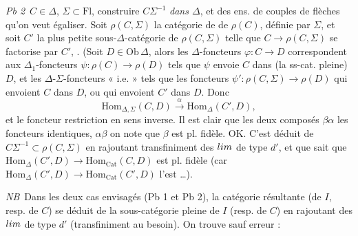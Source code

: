 \documentclass[11pt,a4paper]{article}
\begin{document}
\emph{Pb 2}\ $C \in \Delta$, $\Sigma \subset \mathrm{Fl}$,
construire $C\Sigma^{-1}$ \emph{dans $\Delta$}, et des ens. de
couples de flèches qu'on veut égaliser. 
  Soit $\rho(C, \Sigma)$ la
catégorie de  de $\rho(C)$, définie
par $\Sigma$, et soit $C'$ la plus petite sous-$\Delta$-catégorie
 de $\rho(C, \Sigma)$  telle que $C \to
\rho(C, \Sigma)$ se factorise par $C'$, . (Soit
$D \in \mathrm{Ob}\,\Delta$, alors les $\Delta$-foncteurs $\varphi : C
\to D$ correspondent aux $\Delta_{1}$-foncteurs $\psi : \rho(C) \to
\rho(D)$ tels que $\psi$ envoie $C$ dans (la ss-cat. pleine) $D$, et
les $\Delta$-$\Sigma$-foncteurs « i.e. » tels que les foncteurs $\psi' :
\rho(C, \Sigma) \to \rho(D)$ \struck{\ill{}} qui envoient $C$ dans $D$,
 ou qui envoient  $C'$ dans $D$. Donc
\[
  \mathrm{Hom}_{\Delta, \Sigma}(C, D) \xrightarrow{\ \alpha\ }
  \mathrm{Hom}_{\Delta}(C', D),
\]
 et
\uncertain{$\beta$} le foncteur restriction en sens inverse. Il est clair
que les deux composés \ill{} $\beta\alpha$ \struck{\ill{}} les foncteurs
identiques, \ill{}  $\alpha\beta$ on note que
 $\beta$ est pl. fidèle. OK. C'est
déduit de $C\Sigma^{-1} \subset \rho(C, \Sigma)$ en rajoutant
transfiniment des $\varprojlim$ de type $d'$, et que sait que
$\mathrm{Hom}_{\Delta}(C', D) \to \mathrm{Hom}_{\mathrm{Cat}}(C, D)$ est
pl. fidèle (car $\mathrm{Hom}_{\Delta}(C', D) \to
\mathrm{Hom}_{\mathrm{Cat}}(C', D)$ l'est …).

\emph{NB}\ Dans les deux cas envisagés (Pb 1 et Pb 2), la
catégorie résultante (de $I$, resp. de $C$) se déduit de la
sous-catégorie pleine de $I$ (resp. de $C$) \ill{} en rajoutant des
$\varprojlim$ de type $d'$ (transfiniment au besoin). On trouve sauf
erreur :
\end{document}
